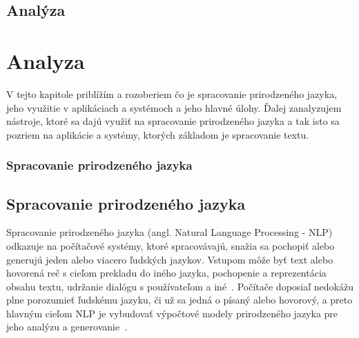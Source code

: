 \newpage
%
%
{
	\section{Analýza} 
}
{
	\chapter{Analyza}
}
V tejto kapitole priblížím a rozoberiem čo je spracovanie prirodzeného jazyka, jeho využitie v aplikáciach a systémoch a jeho hlavné úlohy. Ďalej zanalyzujem nástroje, ktoré sa dajú využiť na spracovanie prirodzeného jazyka a tak isto sa pozriem na aplikácie a systémy, ktorých základom je spracovanie textu.

%
%
{
	\subsection{Spracovanie prirodzeného jazyka}
}
{
	\section{Spracovanie prirodzeného jazyka}
}
\label{subsec:nlp}
Spracovanie prirodzeného jazyka (angl. Natural Language Processing - NLP) odkazuje na počítačové systémy, ktoré spracovávajú, snažia sa pochopiť alebo generujú jeden alebo viacero ľudských jazykov. Vstupom môže byť text alebo hovorená reč s cieľom prekladu do iného jazyka, pochopenie a reprezentácia obsahu textu, udržanie dialógu s používateľom a iné~\cite{AllenNLP}. Počítače doposiaľ nedokážu plne porozumieť ľudskému jazyku, či už sa jedná o písaný alebo hovorový, a preto hlavným cieľom NLP je vybudovať výpočtové modely prirodzeného jazyka pre jeho analýzu a generovanie~\cite{Bharati1995}.

